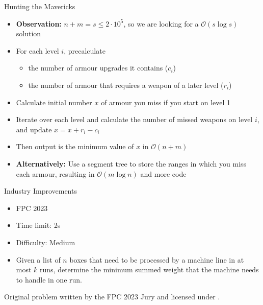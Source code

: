 \documentclass[11pt,pdf, aspectratio=169]{beamer}
\begin{document}
  \begin{frame}{Hunting the Mavericks}
    \begin{itemize}
      \item<1-> \textbf{Observation:} $n+m=s \leq 2\cdot 10^5$, so we are looking for a $\mathcal{O}(s \log s)$ solution
      \item<2-> For each level $i$, precalculate \begin{itemize}
                                                   \item the number of armour upgrades it contains ($c_i$)
                                                   \item the number of armour that requires a weapon of a later level ($r_i$)
      \end{itemize}
      \item<3-> Calculate initial number $x$ of armour you miss if you start on level 1
      \item<4-> Iterate over each level and calculate the number of missed weapons on level $i$, and update $x = x + r_i - c_i$
      \item<4-> Then output is the minimum value of $x$ in $\mathcal{O}(n+m)$
      \item<5-> \textbf{Alternatively:} Use a segment tree to store the ranges in which you miss each armour, resulting in $\mathcal{O}(m\log n)$ and more code
    \end{itemize}
  \end{frame}
  \begin{frame}{Industry Improvements}
    \begin{itemize}
      \item FPC 2023
      \item Time limit: 2s
      \item Difficulty: Medium
      \item Given a list of $n$ boxes that need to be processed by a machine line in at most $k$ runs,
      determine the minimum summed weight that the machine needs to handle in one run.

    \end{itemize}
    Original problem written by the FPC 2023 Jury and licensed under \doclicenseLongNameRef.

    \doclicenseImage

  \end{frame}
\end{document}
